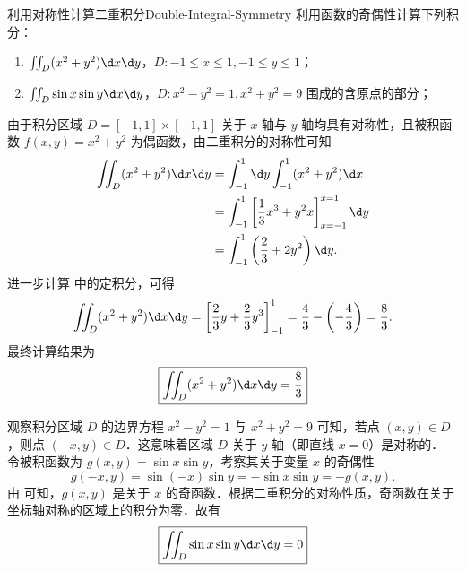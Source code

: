\begin{problem}{利用对称性计算二重积分}{Double-Integral-Symmetry}
    利用函数的奇偶性计算下列积分：
    \begin{enumerate}
        \item $\iint_{D} (x^{2}+y^{2}) \d x \d y$，$D: -1 \le x \le 1, -1 \le y \le 1$；
        \item $\iint_{D} \sin x \sin y \d x \d y$，$D: x^{2}-y^{2}=1, x^{2}+y^{2}=9$ 围成的含原点的部分；
    \end{enumerate}
\end{problem}

\begin{solution}

    由于积分区域 $D = [-1, 1] \times [-1, 1]$ 关于 $x$ 轴与 $y$ 轴均具有对称性，且被积函数 $f(x, y) = x^2 + y^2$ 为偶函数，由二重积分的对称性可知
    \begin{equation}\label{eq:calc-1}
        \begin{aligned}
            \iint_{D} (x^2 + y^2) \d x \d y & = \int_{-1}^1 \d y \int_{-1}^1 (x^2 + y^2) \d x                       \\
                                            & = \int_{-1}^1 \left[ \frac{1}{3}x^3 + y^2 x \right]_{x=-1}^{x=1} \d y \\
                                            & = \int_{-1}^1 \left( \frac{2}{3} + 2y^2 \right) \d y.
        \end{aligned}
    \end{equation}
    进一步计算  中的定积分，可得
    \begin{equation}
        \iint_{D} (x^2 + y^2) \d x \d y = \left[ \frac{2}{3}y + \frac{2}{3}y^3 \right]_{-1}^1 = \frac{4}{3} - \left( -\frac{4}{3} \right) = \frac{8}{3}.
    \end{equation}
    最终计算结果为
    \begin{equation}
        \boxed{\iint_{D} (x^2 + y^2) \d x \d y = \frac{8}{3}}
    \end{equation}


    观察积分区域 $D$ 的边界方程 $x^2 - y^2 = 1$ 与 $x^2 + y^2 = 9$ 可知，若点 $(x, y) \in D$，则点 $(-x, y) \in D$．这意味着区域 $D$ 关于 $y$ 轴（即直线 $x=0$）是对称的．
    令被积函数为 $g(x, y) = \sin x \sin y$，考察其关于变量 $x$ 的奇偶性
    \begin{equation}\label{eq:parity-check}
        g(-x, y) = \sin(-x) \sin y = -\sin x \sin y = -g(x, y).
    \end{equation}
    由  可知，$g(x, y)$ 是关于 $x$ 的奇函数．根据二重积分的对称性质，奇函数在关于坐标轴对称的区域上的积分为零．故有
    \begin{equation}
        \boxed{\iint_{D} \sin x \sin y \d x \d y = 0}
    \end{equation}
\end{solution}



